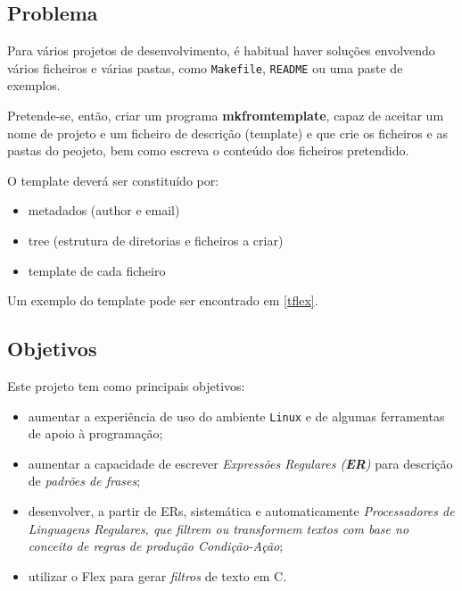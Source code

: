\documentclass[12pt]{article}
\begin{document}
\subsection{Problema}

\vspace{0.5cm}

Para vários projetos de desenvolvimento, é habitual haver soluções envolvendo vários ficheiros e várias pastas, como \texttt{Makefile}, \texttt{README} ou uma paste de exemplos.

Pretende-se, então, criar um programa \textbf{mkfromtemplate}, capaz de aceitar um nome de projeto e um ficheiro de descrição (template) e que crie os ficheiros e as pastas do peojeto, bem como escreva o conteúdo dos ficheiros pretendido.

O template deverá ser constituído por:
\begin{itemize}
  \item metadados (author e email)
  \item tree (estrutura de diretorias e ficheiros a criar)
  \item template de cada ficheiro
\end{itemize}

Um exemplo do template pode ser encontrado em \ref{tflex}.\\

\subsection{Objetivos}

\vspace{0.5cm}

Este projeto tem como principais objetivos:

\begin{itemize}
    \item aumentar a experiência de uso do ambiente \texttt{Linux} e de algumas ferramentas de apoio à programação;
    \item aumentar a capacidade de escrever \textit{Expressões Regulares (\textbf{ER})} para descrição de \textit{padrões de frases};
    \item desenvolver, a partir de ERs, sistemática e automaticamente \textit{Processadores de Linguagens Regulares, que filtrem ou transformem textos com base no conceito de regras de produção \textit{Condição-Ação}};
    \item utilizar o Flex para gerar \textit{filtros} de texto em C.
\end{itemize}
\end{document}
